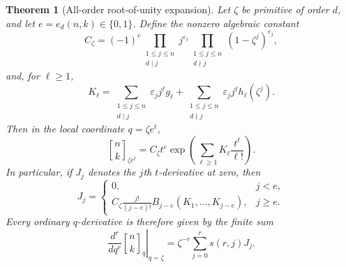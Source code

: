 \documentclass[11pt,a4paper]{article}
\numberwithin{equation}{section}
\newtheorem{theorem}{Theorem}[section]
\theoremstyle{definition}
\theoremstyle{remark}
\newcommand{\qb}[2]{\genfrac{[}{]}{0pt}{}{#1}{#2}_{q}}
\newcommand{\qbb}[3]{\genfrac{[}{]}{0pt}{}{#1}{#2}_{#3}}
\begin{document}
\begin{theorem}[All-order root-of-unity expansion]\label{thm:root-jets}
Let $\zeta$ be primitive of order $d$, and let $e=e_d(n,k)\in\{0,1\}$.
Define the nonzero algebraic constant
\begin{equation}\label{eq:root-C}
 C_\zeta=(-1)^e
       \prod_{\substack{1\le j\le n\\d\mid j}}j^{\varepsilon_j}
       \prod_{\substack{1\le j\le n\\d\nmid j}}
                           (1-\zeta^j)^{\varepsilon_j},
\end{equation}
and, for $\ell\ge1$,
\begin{equation}\label{eq:root-kappa}
 K_\ell=\sum_{\substack{1\le j\le n\\d\mid j}}
                  \varepsilon_j j^\ell g_\ell
       +\sum_{\substack{1\le j\le n\\d\nmid j}}
                  \varepsilon_j j^\ell h_\ell(\zeta^j).
\end{equation}
Then in the local coordinate $q=\zeta e^t$,
\begin{equation}\label{eq:root-expansion}
 \qbb nk{\zeta e^t}
   =C_\zeta t^e\exp\left(\sum_{\ell\ge1}K_\ell\frac{t^\ell}{\ell!}\right).
\end{equation}
In particular, if $J_j$ denotes the $j$th $t$-derivative at zero, then
\begin{equation}\label{eq:root-J}
 J_j=\begin{cases}
 0,&j<e,\\
 \displaystyle C_\zeta\frac{j!}{(j-e)!}
                    B_{j-e}(K_1,\ldots,K_{j-e}),&j\ge e.
 \end{cases}
\end{equation}
Every ordinary $q$-derivative is therefore given by the finite sum
\begin{equation}\label{eq:root-ordinary}
 \left.\frac{d^r}{dq^r}\qb nk\right|_{q=\zeta}
       =\zeta^{-r}\sum_{j=0}^r s(r,j)J_j.
\end{equation}
\end{theorem}
\end{document}
